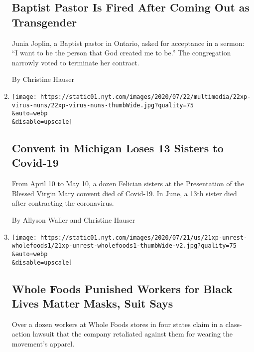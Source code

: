 \begin{enumerate}
{  \subsection{Baptist Pastor Is Fired After Coming Out as
  Transgender}\label{baptist-pastor-is-fired-after-coming-out-as-transgender}}

  Junia Joplin, a Baptist pastor in Ontario, asked for acceptance in a
  sermon: ``I want to be the person that God created me to be.'' The
  congregation narrowly voted to terminate her contract.

  By Christine Hauser
\item
  \href{/2020/07/23/us/nuns-die-covid-michigan.html}{}

  \texttt{[image: https://static01.nyt.com/images/2020/07/22/multimedia/22xp-virus-nuns/22xp-virus-nuns-thumbWide.jpg?quality=75\\\&auto=webp\\\&disable=upscale]}

  \hypertarget{convent-in-michigan-loses-13-sisters-to-covid-19}{%
  \subsection{Convent in Michigan Loses 13 Sisters to
  Covid-19}\label{convent-in-michigan-loses-13-sisters-to-covid-19}}

  From April 10 to May 10, a dozen Felician sisters at the Presentation
  of the Blessed Virgin Mary convent died of Covid-19. In June, a 13th
  sister died after contracting the coronavirus.

  By Allyson Waller and Christine Hauser
\item
  \href{/2020/07/21/business/whole-foods-black-lives-matter.html}{}

  \texttt{[image: https://static01.nyt.com/images/2020/07/21/us/21xp-unrest-wholefoods1/21xp-unrest-wholefoods1-thumbWide-v2.jpg?quality=75\\\&auto=webp\\\&disable=upscale]}

  \hypertarget{whole-foods-punished-workers-for-black-lives-matter-masks-suit-says}{%
  \subsection{Whole Foods Punished Workers for Black Lives Matter Masks,
  Suit
  Says}\label{whole-foods-punished-workers-for-black-lives-matter-masks-suit-says}}

  Over a dozen workers at Whole Foods stores in four states claim in a
  class-action lawsuit that the company retaliated against them for
  wearing the movement's apparel.


\end{enumerate}

